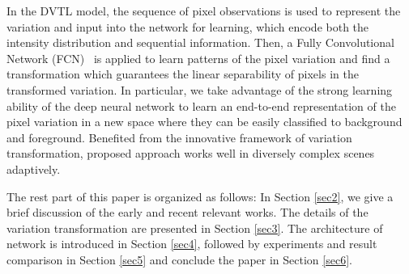 \documentclass[journal]{IEEEtran}
\newcommand{\refsec}[1]{Section \ref{#1}}
\begin{document}
In the DVTL model, 
the sequence of pixel observations is used to represent the variation and input into the network for learning,
which encode both the intensity distribution and sequential information.
%
Then, a Fully Convolutional Network (FCN)\ \cite{Shelhamer2017fcn} is applied to learn patterns of the pixel variation and find a transformation which guarantees the linear separability of pixels in the transformed variation.
%
In particular,
we take advantage of the strong learning ability of the deep neural network to learn an end-to-end representation of the pixel variation in a new space where they can be easily classified to background and foreground.
%
Benefited from the innovative framework of variation transformation,
proposed approach works well in diversely complex scenes adaptively.
%
% 
% 
% 
% 

The rest part of this paper is organized as follows: In \refsec{sec2}, we give a brief discussion of the early and recent relevant works. 
%
The details of the variation transformation are presented in \refsec{sec3}. The architecture of network is introduced in \refsec{sec4}, followed by experiments and result comparison in \refsec{sec5} and conclude the paper in \refsec{sec6}. 
\end{document}
